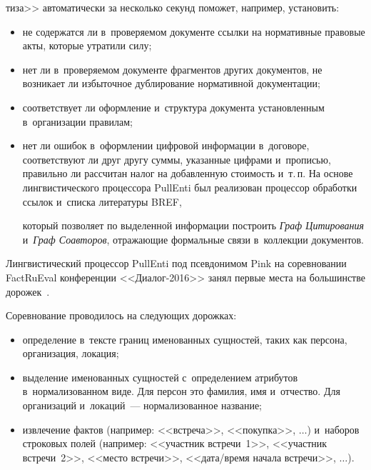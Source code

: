 \begin{multicols}{2}

\noindent
тиза>> автоматически за 
несколько секунд поможет, например, установить:
   \begin{itemize}
   \item не содержатся ли в~проверяемом документе ссылки на нормативные 
правовые акты, которые утратили силу;
   \item нет ли в~проверяемом документе фрагментов других документов, не 
возникает ли избыточное дублирование нормативной документации;
   \item соответствует ли оформление и~структура документа уста\-нов\-лен\-ным 
   в~организации правилам;\\[-13pt]
   \item нет ли ошибок в~оформлении цифровой информации в~договоре, 
соответствуют ли друг другу суммы, указанные цифрами и~про\-писью, 
правильно ли рассчитан налог на добавленную стоимость и~т.\,п. На основе лингвистического процессора 
PullEnti был реализован процессор обработки ссылок и~списка литературы 
BREF,\linebreak
\vspace*{-12pt}

\pagebreak

\noindent
который позволяет по выделенной информации по\-строить \textit{Граф 
Цитирования} и~\textit{Граф Соавторов}, отражающие формальные связи 
в~коллекции документов.
   \end{itemize}
    
   Лингвистический процессор PullEnti под псевдонимом Pink на 
соревновании FactRuEval конференции <<Диа\-лог-2016>> занял первые места 
на большинстве дорожек~\cite{12-koz}.
   
   Соревнование проводилось на следующих дорожках:
   \begin{itemize}
   \item определение в~тексте границ именованных сущностей, таких как 
персона, организация, локация;
   \item выделение именованных сущностей с~определением атрибутов 
в~нормализованном виде. Для персон это фамилия, имя и~отчество. Для 
организаций и~локаций~--- нормализованное название;
   \item извлечение фактов (например: <<встреча>>, <<покупка>>, $\ldots$) 
и~наборов строковых полей (например: <<участник встречи~1>>, 
<<участник встречи~2>>, <<место встречи>>, <<да\-та/вре\-мя начала 
встречи>>, $\ldots$).
   \end{itemize}
   

\end{multicols}
